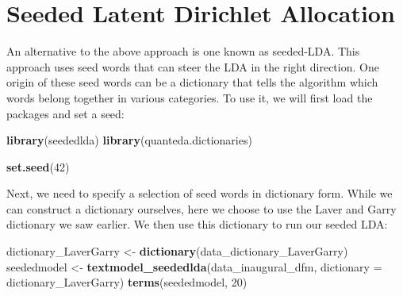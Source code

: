 \documentclass[
]{book}
\newenvironment{Shaded}{\begin{snugshade}}{\end{snugshade}}
\newcommand{\AttributeTok}[1]{\textcolor[rgb]{0.13,0.29,0.53}{#1}}
\newcommand{\DecValTok}[1]{\textcolor[rgb]{0.00,0.00,0.81}{#1}}
\newcommand{\FunctionTok}[1]{\textcolor[rgb]{0.13,0.29,0.53}{\textbf{#1}}}
\newcommand{\NormalTok}[1]{#1}
\newcommand{\OtherTok}[1]{\textcolor[rgb]{0.56,0.35,0.01}{#1}}
\begin{document}
\section{Seeded Latent Dirichlet Allocation}\label{seeded-latent-dirichlet-allocation}

An alternative to the above approach is one known as seeded-LDA. This approach uses seed words that can steer the LDA in the right direction. One origin of these seed words can be a dictionary that tells the algorithm which words belong together in various categories. To use it, we will first load the packages and set a seed:

\begin{Shaded}
\begin{Highlighting}[]
\FunctionTok{library}\NormalTok{(seededlda)}
\FunctionTok{library}\NormalTok{(quanteda.dictionaries)}

\FunctionTok{set.seed}\NormalTok{(}\DecValTok{42}\NormalTok{)}
\end{Highlighting}
\end{Shaded}

Next, we need to specify a selection of seed words in dictionary form. While we can construct a dictionary ourselves, here we choose to use the Laver and Garry dictionary we saw earlier. We then use this dictionary to run our seeded LDA:

\begin{Shaded}
\begin{Highlighting}[]
\NormalTok{dictionary\_LaverGarry }\OtherTok{\textless{}{-}} \FunctionTok{dictionary}\NormalTok{(data\_dictionary\_LaverGarry)}
\NormalTok{seededmodel }\OtherTok{\textless{}{-}} \FunctionTok{textmodel\_seededlda}\NormalTok{(data\_inaugural\_dfm, }\AttributeTok{dictionary =}\NormalTok{ dictionary\_LaverGarry)}
\FunctionTok{terms}\NormalTok{(seededmodel, }\DecValTok{20}\NormalTok{)}
\end{Highlighting}
\end{Shaded}
\end{document}
